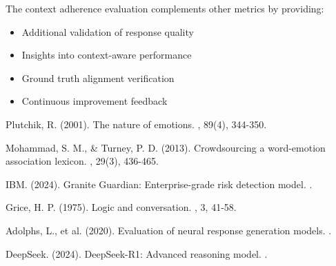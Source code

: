 \documentclass[12pt]{article}
\begin{document}
The context adherence evaluation complements other metrics by providing:
\begin{itemize}
    \item Additional validation of response quality
    \item Insights into context-aware performance
    \item Ground truth alignment verification
    \item Continuous improvement feedback
\end{itemize}

\begin{thebibliography}{9}
Plutchik, R. (2001).
\newblock The nature of emotions.
, 89(4), 344-350.

Mohammad, S. M., \& Turney, P. D. (2013).
\newblock Crowdsourcing a word-emotion association lexicon.
, 29(3), 436-465.

IBM. (2024).
\newblock Granite Guardian: Enterprise-grade risk detection model.
.

Grice, H. P. (1975).
\newblock Logic and conversation.
, 3, 41-58.

Adolphs, L., et al. (2020).
\newblock Evaluation of neural response generation models.
.

DeepSeek. (2024).
\newblock DeepSeek-R1: Advanced reasoning model.
.
\end{thebibliography}
\end{document}
